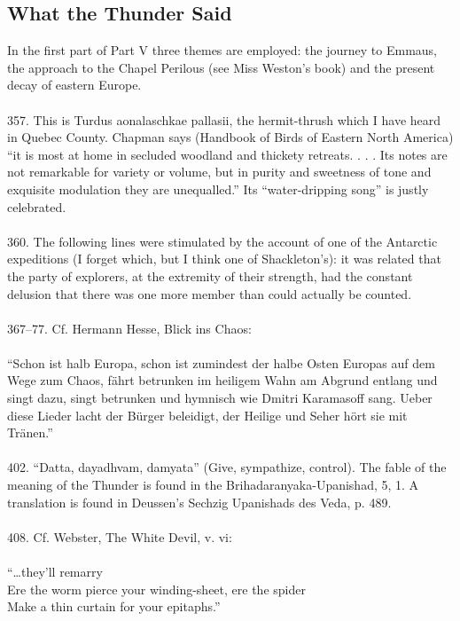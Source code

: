 \documentclass{article}
\begin{document}
\subsection{What the Thunder Said}
In the first part of Part V three themes are employed:
the journey to Emmaus, the approach to the Chapel Perilous
(see Miss Weston's book) and the present decay of eastern Europe. \\
 \\
357.  This is Turdus aonalaschkae pallasii, the hermit-thrush
which I have heard in Quebec County.  Chapman says (Handbook of
Birds of Eastern North America) ``it is most at home in secluded
woodland and thickety retreats. . . . Its notes are not remarkable
for variety or volume, but in purity and sweetness of tone and
exquisite modulation they are unequalled.''  Its ``water-dripping song''
is justly celebrated. \\
 \\
360.  The following lines were stimulated by the account of one
of the Antarctic expeditions (I forget which, but I think one
of Shackleton's): it was related that the party of explorers,
at the extremity of their strength, had the constant delusion
that there was one more member than could actually be counted. \\
 \\
367--77. Cf.  Hermann Hesse, Blick ins Chaos: \\
 \\
``Schon ist halb Europa, schon ist zumindest der halbe Osten Europas auf dem
Wege zum Chaos, f\"ahrt betrunken im heiligem Wahn am Abgrund entlang
und singt dazu, singt betrunken und hymnisch wie Dmitri Karamasoff sang.
Ueber diese Lieder lacht der B\"urger beleidigt, der Heilige
und Seher h\"ort sie mit Tr\"anen.'' \\
 \\
402.  ``Datta, dayadhvam, damyata'' (Give, sympathize,
control). The fable of the meaning of the Thunder is found
in the Brihadaranyaka-Upanishad, 5, 1.  A translation is found
in Deussen's Sechzig Upanishads des Veda, p.  489. \\
 \\
408.  Cf.  Webster, The White Devil, v.  vi: \\
 \\
\hspace*{2.5in}            ``\ldots they'll remarry \\
\indent   Ere the worm pierce your winding-sheet, ere the spider \\
\indent   Make a thin curtain for your epitaphs.'' \\
\end{document}
